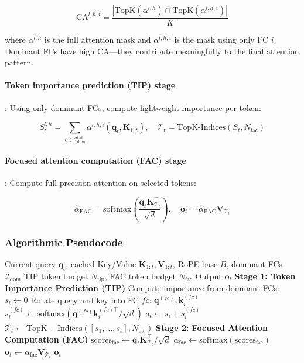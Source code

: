 \documentclass[11pt,a4paper]{article}
\begin{document}
\[
\text{CA}^{l,h,i} = \frac{|\text{TopK}(\alpha^{l,h}) \cap \text{TopK}(\alpha^{l,h,i})|}{K}
\]

where $\alpha^{l,h}$ is the full attention mask and $\alpha^{l,h,i}$ is the mask using only FC $i$. Dominant FCs have high CA---they contribute meaningfully to the final attention pattern.

\paragraph{Token importance prediction (TIP) stage}: Using only dominant FCs, compute lightweight importance per token:

\[
S_t^{l,h} = \sum_{i \in \mathcal{I}_{\text{dom}}^{l,h}} \alpha^{l,h,i}(\mathbf{q}_t, \mathbf{K}_{1:t}), \quad \mathcal{T}_t = \text{TopK-Indices}(S_t, N_{\text{fac}})
\]

\paragraph{Focused attention computation (FAC) stage}: Compute full-precision attention on selected tokens:

\[
\hat{\alpha}_{\text{FAC}} = \text{softmax}\left(\frac{\mathbf{q}_t \mathbf{K}_{\mathcal{T}_t}^\top}{\sqrt{d}}\right), \quad \mathbf{o}_t = \hat{\alpha}_{\text{FAC}} \mathbf{V}_{\mathcal{T}_t}
\]

\subsubsection{Algorithmic Pseudocode}

\begin{algorithm}[H]
\caption{FASA: Frequency-Aware Sparse Attention (Inference-Time)}
\begin{algorithmic}[1]
\Require Current query $\mathbf{q}_t$, cached Key/Value $\mathbf{K}_{1:t}, \mathbf{V}_{1:t}$, RoPE base $B$, dominant FCs $\mathcal{I}_{\text{dom}}$
\Require TIP token budget $N_{\text{tip}}$, FAC token budget $N_{\text{fac}}$
\Ensure Output $\mathbf{o}_t$
\State \textbf{Stage 1: Token Importance Prediction (TIP)}
        \State Compute importance from dominant FCs: $s_i \gets 0$
            \State Rotate query and key into FC $fc$: $\mathbf{q}^{(fc)}, \mathbf{k}_i^{(fc)}$
            \State $s_i^{(fc)} \gets \text{softmax}(\mathbf{q}^{(fc)} \mathbf{k}_i^{(fc)\top} / \sqrt{d}) $
            \State $s_i \gets s_i + s_i^{(fc)}$
        \EndFor
    \EndFor
    \State $\mathcal{T}_t \gets \mathrm{TopK-Indices}([s_1, \ldots, s_t], N_{\text{fac}})$ 
\EndFor
\State \textbf{Stage 2: Focused Attention Computation (FAC)}
\State $\text{scores}_{\text{fac}} \gets \mathbf{q}_t \mathbf{K}_{\mathcal{T}_t}^\top / \sqrt{d}$ 
\State $\alpha_{\text{fac}} \gets \text{softmax}(\text{scores}_{\text{fac}})$ 
\State $\mathbf{o}_t \gets \alpha_{\text{fac}} \mathbf{V}_{\mathcal{T}_t}$ 
\Return $\mathbf{o}_t$
\end{algorithmic}
\end{algorithm}
\end{document}
